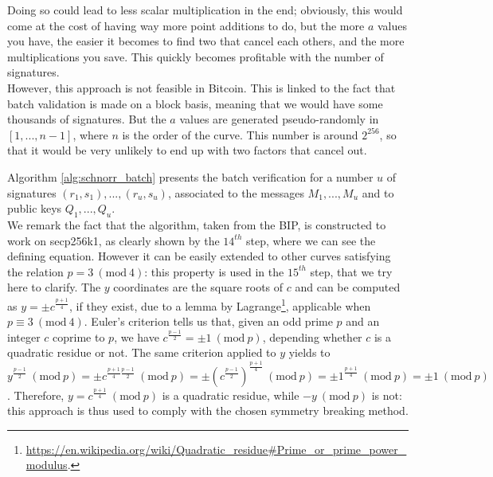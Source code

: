 Doing so could lead to less scalar multiplication in the end; obviously, this would come at the cost of having way more point additions to do, but the more $a$ values you have, the easier it becomes to find two that cancel each others, and the more multiplications you save. This quickly becomes profitable with the number of signatures.
\\
However, this approach is not feasible in Bitcoin. This is linked to the fact that batch validation is made on a block basis, meaning that we would have some thousands of signatures. But the $a$ values are generated pseudo-randomly in $[1, ..., n - 1]$, where $n$ is the order of the curve. This number is around $2^{256}$, so that it would be very unlikely to end up with two factors that cancel out.

\bigskip
\noindent
Algorithm \ref{alg:schnorr_batch} presents the batch verification for a number $u$ of signatures $(r_1, s_1), ..., (r_u, s_u)$, associated to the messages $M_1, ..., M_u$ and to public keys $Q_1, ..., Q_u$.
\\
We remark the fact that the algorithm, taken from the BIP, is constructed to work on secp256k1, as clearly shown by the $14^{th}$ step, where we can see the defining equation. However it can be easily extended to other curves satisfying the relation $p = 3 \ (\text{mod} \ 4)$: this property is used in the $15^{th}$ step, that we try here to clarify. The $y$ coordinates are the square roots of $c$ and can be computed as $y = \pm c^{\frac{p + 1}{4}}$, if they exist, due to a lemma by Lagrange\footnote{\url{https://en.wikipedia.org/wiki/Quadratic\_residue\#Prime\_or\_prime\_power\_modulus}.}, applicable when $p \equiv 3 \ (\text{mod} \ 4)$. Euler's criterion tells us that, given an odd prime $p$ and an integer $c$ coprime to $p$, we have $c^{\frac{p - 1}{2}} = \pm 1 \ (\text{mod} \ p)$, depending whether $c$ is a quadratic residue or not. The same criterion applied to $y$ yields to $y^{\frac{p - 1}{2}} \ (\text{mod} \ p) = \pm c^{\frac{p + 1}{4}\frac{p - 1}{2}} \ (\text{mod} \ p) = \pm (c^{\frac{p - 1}{2}})^{\frac{p + 1}{4}} \ (\text{mod} \ p) = \pm 1^{\frac{p + 1}{4}} \ (\text{mod} \ p) = \pm 1 \ (\text{mod} \ p)$. Therefore, $y = c^{\frac{p + 1}{4}} \ (\text{mod} \ p)$ is a quadratic residue, while $-y \ (\text{mod} \ p)$ is not: this approach is thus used to comply with the chosen symmetry breaking method.


